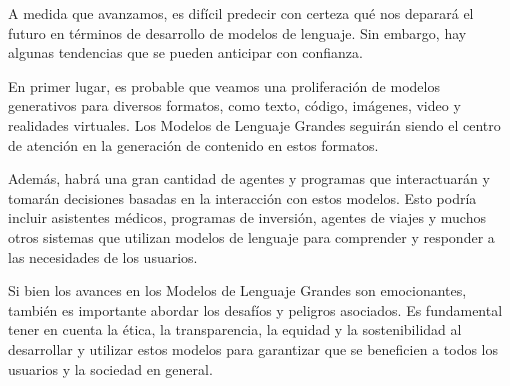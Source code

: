 A medida que avanzamos, es difícil predecir con certeza qué nos deparará el futuro en términos de desarrollo de modelos de lenguaje. Sin embargo, hay algunas tendencias que se pueden anticipar con confianza.

En primer lugar, es probable que veamos una proliferación de modelos generativos para diversos formatos, como texto, código, imágenes, video y realidades virtuales. Los Modelos de Lenguaje Grandes seguirán siendo el centro de atención en la generación de contenido en estos formatos.

Además, habrá una gran cantidad de agentes y programas que interactuarán y tomarán decisiones basadas en la interacción con estos modelos. Esto podría incluir asistentes médicos, programas de inversión, agentes de viajes y muchos otros sistemas que utilizan modelos de lenguaje para comprender y responder a las necesidades de los usuarios.

Si bien los avances en los Modelos de Lenguaje Grandes son emocionantes, también es importante abordar los desafíos y peligros asociados. Es fundamental tener en cuenta la ética, la transparencia, la equidad y la sostenibilidad al desarrollar y utilizar estos modelos para garantizar que se beneficien a todos los usuarios y la sociedad en general.





